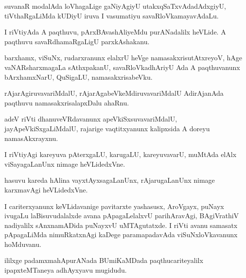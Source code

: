 \documentclass{article}
\begin{document}
\begin{mn}
suvanaR modalAda loVhagaLige gaNiyAgiyU  utakxqSaTxvAdadAdxgiyU,  
tiVthaRgaLiMda kUDiyU iruva I vasumatiyu  savaRloVkamayavAdaLu.
\end{mn}

\begin{mn}
I riVtiyAda A paqthuvu, pArxBAvashAliyeMdu purANadalilx heVLide.  
A paqthuvu savaRdhamaRgaLigU parxkAshakanu.
\end{mn}

\begin{mn}
barxhamx, viSuNx, rudarxranunx elalxrU heVge namasakxrisutAtxreyoV, hAge 
vaNARsharxmagaLa  sAthxpakanU, savaRloVkadhAriyU Ada A paqthuvanunx 
bArxhamxNarU, QuSigaLU, namasakxrisabeVku.
\end{mn}

\begin{mn}
rAjarAgiruvavariMdalU, rAjarAgabeVkeMdiruvavariMdalU AdirAjanAda 
paqthuvu namasakxrisalapxDalu ahaRnu.
\end{mn}

\begin{mn}
adeV riVti dhanuveVRdavanunx apeVkiSxsuvavariMdalU, jayApeVkiSxgaLiMdalU, 
rajarige vaqtitxyanunx kalipxsida A doreyu namasAkxrayxnu.
\end{mn}

\begin{mn}
I riVtiyAgi kareyuva pAterxgaLU,  karugaLU, kareyuvavarU, muMtAda elAlx 
viSayagaLanUnx nimage heVLidedxVne. 
\end{mn}

\begin{mn}
hasuvu kareda hAlina vayxtAyxsagaLanUnx, rAjarugaLanUnx nimage karxmavAgi heVLidedxVne.
\end{mn}

\begin{mn}
I cariterxyanunx keVLidavanige pavitarxte yashasusx, AroVgayx, puNayx ivugaLu 
laBisuvudalalxde avana pApagaLelalxvU parihAravAgi, BAgiVrathiV nadiyalilx 
sAnxnamADida puNayxvU uMTAgutatxde.  I riVti avanu samasatx pApagaLiMda  
nimuRkatxnAgi kaDege paramapadavAda viSuNxloVkavanunx hoMduvanu.
\end{mn}

\begin{mn}
ililxge padamxmahApurANada BUmiKaMDada paqthucariteyalilx ipapxteMTaneya adhAyxyavu mugidudu.
\end{mn}


\end{document}
